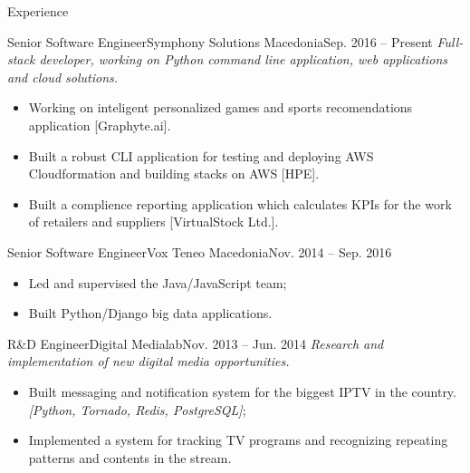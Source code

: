 \documentclass[]{mcdowellcv}
\begin{document}
    \begin{cvsection}{Experience}
    \label{Employment Record}
        \begin{cvsubsection}{Senior Software Engineer}{Symphony Solutions Macedonia}{Sep. 2016 -- Present}
            \textit{Full-stack developer, working on Python command line application, web applications and cloud solutions.}
             \begin{itemize}
                 \item Working on inteligent personalized games and sports recomendations application [Graphyte.ai].
                 \item Built a robust CLI application for testing and deploying AWS Cloudformation and building stacks on AWS [HPE].
                 \item Built a complience reporting application which calculates KPIs for the work of retailers and suppliers [VirtualStock Ltd.].
             \end{itemize}
        \end{cvsubsection}
        \begin{cvsubsection}{Senior Software Engineer}{Vox Teneo Macedonia}{Nov. 2014 -- Sep. 2016}
            \begin{itemize}
                \item Led and supervised the Java/JavaScript team;
                \item Built Python/Django big data applications.
            \end{itemize}
        \end{cvsubsection}
        \begin{cvsubsection}{R\&D Engineer}{Digital Medialab}{Nov. 2013 -- Jun. 2014}
            \textit{Research and implementation of new digital media opportunities.}
            \begin{itemize}
                \item Built messaging and notification system for the biggest IPTV in the country.
                    \textit{[Python, Tornado, Redis, PostgreSQL]};
                \item Implemented a system for tracking TV programs and recognizing repeating patterns and contents in the stream.
            \end{itemize}

\end{cvsubsection}
\end{cvsection}
\end{document}
